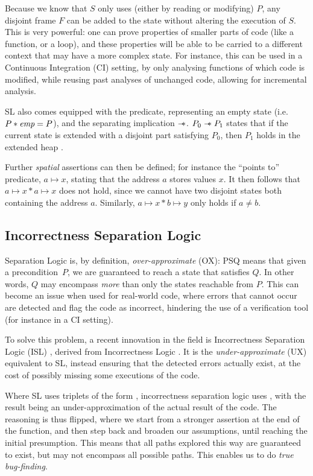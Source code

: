 Because we know that $S$ only uses (either by reading or modifying) $P$, any disjoint frame $F$ can be added to the state without altering the execution of $S$. This is very powerful: one can prove properties of smaller parts of code (like a function, or a loop), and these properties will be able to be carried to a different context that may have a more complex state. For instance, this can be used in a Continuous Integration (CI) setting, by only analysing functions of which code is modified, while reusing past analyses of unchanged code, allowing for incremental analysis.

SL also comes equipped with the \emp{} predicate, representing an empty state (i.e. ${P * \textit{emp} = P}$), and the separating implication $\mathrel{-\!\!\ast}$. $P_0 \mathrel{-\!\!\ast} P_1$ states that if the current state is extended with a disjoint part satisfying $P_0$, then $P_1$ holds in the extended heap \cite{seplogic2}.

Further \emph{spatial} assertions can then be defined; for instance the ``points to'' predicate, $a \mapsto x$, stating that the address $a$ stores values $x$. It then follows that $a \mapsto x * a \mapsto x$ does not hold, since we cannot have two disjoint states both containing the address $a$. Similarly, $a\mapsto x * b \mapsto y$ only holds if $a\neq b$.

\subsection{Incorrectness Separation Logic}

Separation Logic is, by definition, \emph{over-approximate} (OX): \SLtriple PSQ means that given a precondition~$P$, we are guaranteed to reach a state that satisfies $Q$. In other words, $Q$ may encompass \emph{more} than only the states reachable from $P$. This can become an issue when used for real-world code, where errors that cannot occur are detected and flag the code as incorrect, hindering the use of a verification tool (for instance in a CI setting).

To solve this problem, a recent innovation in the field is Incorrectness Separation Logic (ISL) \cite{isl}, derived from Incorrectness Logic \cite{incorrectnesslogic}. It is the \emph{under-approximate} (UX) equivalent to SL, instead ensuring that the detected errors actually exist, at the cost of possibly missing some executions of the code.

Where SL uses triplets of the form , incorrectness separation logic uses , with the result being an under-approximation of the actual result of the code. The reasoning is thus flipped, where we start from a stronger assertion at the end of the function, and then step back and broaden our assumptions, until reaching the initial presumption. This means that all paths explored this way are guaranteed to exist, but may not encompass all possible paths. This enables us to do \emph{true bug-finding}.

